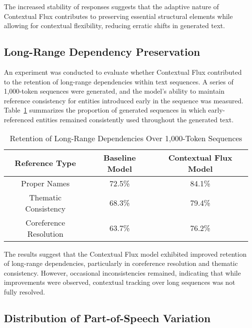\documentclass{article}
\begin{document}
The increased stability of responses suggests that the adaptive nature of Contextual Flux contributes to preserving essential structural elements while allowing for contextual flexibility, reducing erratic shifts in generated text.

\subsection{Long-Range Dependency Preservation}

An experiment was conducted to evaluate whether Contextual Flux contributed to the retention of long-range dependencies within text sequences. A series of 1,000-token sequences were generated, and the model's ability to maintain reference consistency for entities introduced early in the sequence was measured. Table~\ref{tab:dependency} summarizes the proportion of generated sequences in which early-referenced entities remained consistently used throughout the generated text.

\begin{table}[h]
	\centering
	\caption{Retention of Long-Range Dependencies Over 1,000-Token Sequences}
	\label{tab:dependency}
	\begin{tabular}{|c|c|c|}
		\hline
		\textbf{Reference Type} & \textbf{Baseline Model} & \textbf{Contextual Flux Model} \\
		\hline
		Proper Names & 72.5\% & 84.1\% \\
		Thematic Consistency & 68.3\% & 79.4\% \\
		Coreference Resolution & 63.7\% & 76.2\% \\
		\hline
	\end{tabular}
\end{table}

The results suggest that the Contextual Flux model exhibited improved retention of long-range dependencies, particularly in coreference resolution and thematic consistency. However, occasional inconsistencies remained, indicating that while improvements were observed, contextual tracking over long sequences was not fully resolved.

\subsection{Distribution of Part-of-Speech Variation}
\end{document}
